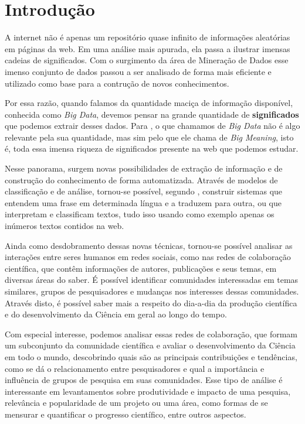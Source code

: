 \chapter{Introdução}
\label{cap:introducao}

A internet não é apenas um repositório quase infinito de informações aleatórias em páginas da web. Em uma análise mais apurada, ela passa a ilustrar imensas cadeias de significados. Com o surgimento da área de Mineração de Dados esse imenso conjunto de dados passou a ser analisado de forma mais eficiente e utilizado como base para a contrução de novos conhecimentos.

Por essa razão, quando falamos da quantidade maciça de informação disponível, conhecida como \textit{Big Data}, devemos pensar na grande quantidade de \textbf{significados} que podemos extrair desses dados. Para \cite{Kay2014}, o que chamamos de \textit{Big Data} não é algo relevante pela sua quantidade, mas sim pelo que ele chama de \textit{Big Meaning}, isto é, toda essa imensa riqueza de significados presente na web que podemos estudar.

Nesse panorama, surgem novas possibilidades de extração de informação e de construção do conhecimento de forma automatizada. Através de modelos de classificação e de análise, tornou-se possível, segundo \cite{Halevy2009}, construir sistemas que entendem uma frase em determinada língua e a traduzem para outra, ou que interpretam e classificam textos, tudo isso usando como exemplo apenas os inúmeros textos contidos na web.

Ainda como desdobramento dessas novas técnicas, tornou-se possível analisar as interações entre seres humanos em redes sociais, como nas redes de colaboração científica, que contêm informações de autores, publicações e seus temas, em diversas áreas do saber. É possível identificar comunidades interessadas em temas similares, grupos de pesquisadores e mudanças nos interesses dessas comunidades. Através disto, é possível saber mais a respeito do dia-a-dia da produção científica e do desenvolvimento da Ciência em geral ao longo do tempo.

Com especial interesse, podemos analisar essas redes de colaboração, que formam um subconjunto da comunidade científica e avaliar o desenvolvimento da Ciência em todo o mundo, descobrindo quais são as principais contribuições e tendências, como se dá o relacionamento entre pesquisadores e qual a importância e influência de grupos de pesquisa em suas comunidades. Esse tipo de análise é interessante em levantamentos sobre produtividade e impacto de uma pesquisa, relevância e popularidade de um projeto ou uma área, como formas de se mensurar e quantificar o progresso científico, entre outros aspectos.

